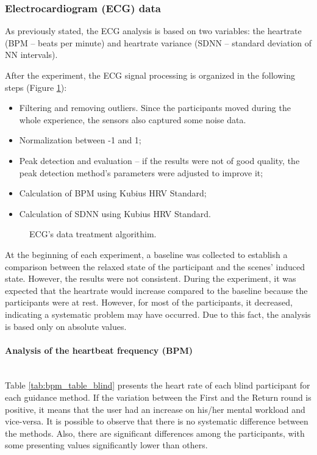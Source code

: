 \subsubsection{Electrocardiogram (ECG) data}
\label{subsubsec:results_ecg_1}

As previously stated, the ECG analysis is based on two variables: the heartrate (BPM – beats per minute) and heartrate variance (SDNN – standard deviation of NN intervals). 

After the experiment, the ECG signal processing is organized in the following steps (Figure \ref{fig:ecg_algorithim}): 

\begin{itemize}
    \item Filtering and removing outliers. Since the participants moved during the whole experience, the sensors also captured some noise data.
    \item Normalization between -1 and 1;
    \item Peak detection and evaluation – if the results were not of good quality, the peak detection method's parameters were adjusted to improve it; 
    \item Calculation of BPM using Kubius HRV Standard;
    \item Calculation of SDNN using Kubius HRV Standard.
\end{itemize}

\begin{figure}[H]
    \centering
    
    \caption{ECG's data treatment algorithim.}
    \label{fig:ecg_algorithim}
\end{figure}

At the beginning of each experiment, a baseline was collected to establish a comparison between the relaxed state of the participant and the scenes' induced state. However, the results were not consistent.  During the experiment, it was expected that the heartrate would increase compared to the baseline because the participants were at rest. However, for most of the participants, it decreased, indicating a systematic problem may have occurred. Due to this fact, the analysis is based only on absolute values.

\paragraph{Analysis of the heartbeat frequency (BPM)}\mbox{}\\

Table \ref{tab:bpm_table_blind} presents the heart rate of each blind participant for each guidance method. If the variation between the First and the Return round is positive, it means that the user had an increase on his/her mental workload and vice-versa. It is possible to observe that there is no systematic difference between the methods. Also, there are significant differences among the participants, with some presenting values significantly lower than others.

